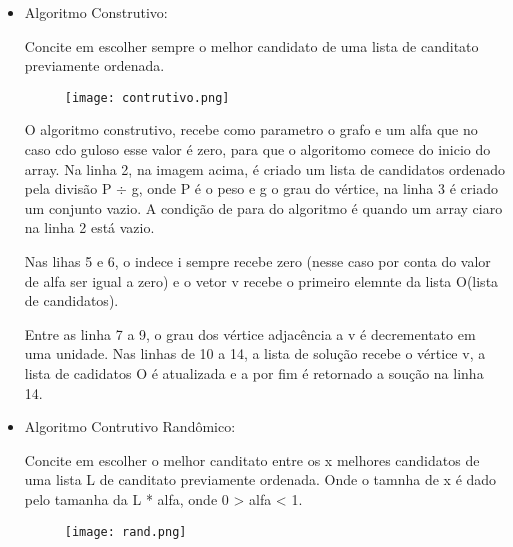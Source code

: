 \documentclass[12pt, fleqn]{article}
\begin{document}
	  \begin{itemize}
	    \item Algoritmo Construtivo:
		\par Concite em escolher sempre o melhor candidato de uma lista de canditato previamente ordenada.
	      \begin{figure}[!htpb]
		\texttt{[image: contrutivo.png]}
		\label{fig:contrutivo}
	      \end{figure}  
	      
	      \par O algoritmo construtivo, recebe como parametro o grafo e um alfa que no caso cdo guloso esse valor é zero, 
	      para que o algoritomo comece do inicio do array. Na linha 2, na imagem acima, é criado um lista de candidatos ordenado pela divisão  P $\div$ g, onde P é o peso e g o grau do vértice, na linha 3 é criado um conjunto vazio.
	      A condição de para do algoritmo é quando um array ciaro na linha 2 está vazio.	      
	      \par Nas lihas 5 e 6, o indece i sempre recebe zero (nesse caso por conta do valor de alfa ser igual a zero)
		    e o vetor v recebe o primeiro elemnte da lista O(lista de candidatos).	
	      \par Entre as linha 7 a 9, o grau dos vértice adjacência a v é decrementato em uma unidade. 
		    Nas linhas de 10 a 14, a lista de solução recebe o vértice v,
		    a lista de cadidatos O é atualizada e a por fim é retornado a soução na linha 14. 
	    
	    \newpage
	    
	    \item Algoritmo Contrutivo Randômico:
		\par Concite em escolher o melhor canditato entre os x melhores candidatos de uma lista L de canditato previamente ordenada. 
		Onde o tamnha de x é dado pelo tamanha da L * alfa, onde 0 > alfa < 1.
		\\
	      \begin{figure}[!htpb]
		\texttt{[image: rand.png]}
		\label{fig:randomico}
	      \end{figure}
	      

\end{itemize}
\end{document}
